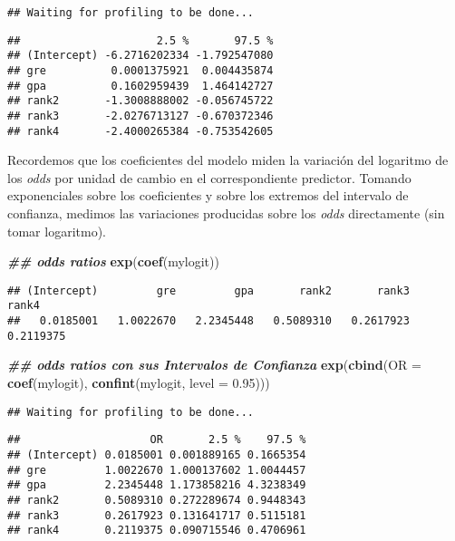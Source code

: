 \documentclass[
]{article}
\newenvironment{Shaded}{\begin{snugshade}}{\end{snugshade}}
\newcommand{\AttributeTok}[1]{\textcolor[rgb]{0.13,0.29,0.53}{#1}}
\newcommand{\DocumentationTok}[1]{\textcolor[rgb]{0.56,0.35,0.01}{\textbf{\textit{#1}}}}
\newcommand{\FloatTok}[1]{\textcolor[rgb]{0.00,0.00,0.81}{#1}}
\newcommand{\FunctionTok}[1]{\textcolor[rgb]{0.13,0.29,0.53}{\textbf{#1}}}
\newcommand{\NormalTok}[1]{#1}
\begin{document}
\begin{verbatim}
## Waiting for profiling to be done...
\end{verbatim}

\begin{verbatim}
##                     2.5 %       97.5 %
## (Intercept) -6.2716202334 -1.792547080
## gre          0.0001375921  0.004435874
## gpa          0.1602959439  1.464142727
## rank2       -1.3008888002 -0.056745722
## rank3       -2.0276713127 -0.670372346
## rank4       -2.4000265384 -0.753542605
\end{verbatim}

Recordemos que los coeficientes del modelo miden la variación del
logaritmo de los \emph{odds} por unidad de cambio en el correspondiente
predictor. Tomando exponenciales sobre los coeficientes y sobre los
extremos del intervalo de confianza, medimos las variaciones producidas
sobre los \emph{odds} directamente (sin tomar logaritmo).

\begin{Shaded}
\begin{Highlighting}[]
\DocumentationTok{\#\# odds ratios}
\FunctionTok{exp}\NormalTok{(}\FunctionTok{coef}\NormalTok{(mylogit))}
\end{Highlighting}
\end{Shaded}

\begin{verbatim}
## (Intercept)         gre         gpa       rank2       rank3       rank4 
##   0.0185001   1.0022670   2.2345448   0.5089310   0.2617923   0.2119375
\end{verbatim}

\begin{Shaded}
\begin{Highlighting}[]
\DocumentationTok{\#\# odds ratios con sus Intervalos de Confianza}
\FunctionTok{exp}\NormalTok{(}\FunctionTok{cbind}\NormalTok{(}\AttributeTok{OR =} \FunctionTok{coef}\NormalTok{(mylogit), }\FunctionTok{confint}\NormalTok{(mylogit, }\AttributeTok{level =} \FloatTok{0.95}\NormalTok{)))}
\end{Highlighting}
\end{Shaded}

\begin{verbatim}
## Waiting for profiling to be done...
\end{verbatim}

\begin{verbatim}
##                    OR       2.5 %    97.5 %
## (Intercept) 0.0185001 0.001889165 0.1665354
## gre         1.0022670 1.000137602 1.0044457
## gpa         2.2345448 1.173858216 4.3238349
## rank2       0.5089310 0.272289674 0.9448343
## rank3       0.2617923 0.131641717 0.5115181
## rank4       0.2119375 0.090715546 0.4706961
\end{verbatim}
\end{document}
